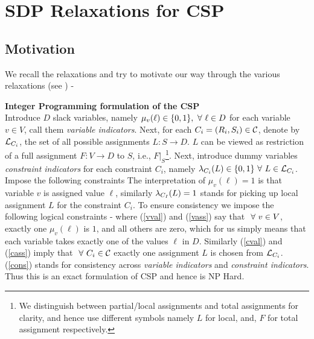 \section{SDP Relaxations for CSP}

\subsection{Motivation}

We recall the relaxations and try to motivate our way through the various relaxations (see \cite{Ryan}) -
\begin{discussion}{\bf Integer Programming formulation of the CSP}\\
Introduce $D$ slack variables, namely $\mu_v(\ell) \in \{ 0, 1 \}, \ \forall \  \ell \in D$ for each variable $v \in V$, call them \textit{variable indicators}. 
Next, for each $C_i=(R_i,S_i)\in \mathcal{C}$, denote by $\mathcal{L}_{C_i}$, the set of all possible assignments $L : S \rightarrow D$. 
$L$ can be viewed as restriction of a full assignment $F: V \rightarrow D$ to $S$, i.e., $F|_S$\footnote{We distinguish between partial/local assignments and total assignments for clarity, and hence use different symbols namely $L$ for local, and, $F$ for total assignment respectively.}. 
Next, introduce dummy variables \textit{constraint indicators} for each constraint $C_i$, namely $\lambda_{C_i}(L) \in \{ 0, 1\} \ \forall \  L \in \mathcal{L}_{C_i}$. 
Impose the following constraints 
The interpretation of $\mu_v(\ell)=1$ is that variable $v$ is assigned value $\ell$, similarly $\lambda_{C_I}(L)=1$ stands for picking up local assignment $L$ for the constraint $C_i$. 
To ensure consistency we impose the following logical constraints -
  where (\ref{vval}) and (\ref{vass}) say that $\ \forall \  v \in V$, exactly one $\mu_v(\ell)$ is $1$, and all others are zero, which for us simply means that each variable takes exactly one of the values $\ell$ in $D$. 
Similarly (\ref{cval}) and (\ref{cass}) imply that $\ \forall \  C_i \in \mathcal{C}$ exactly one assignment $L$ is chosen from $\mathcal{L}_{C_i}$. 
(\ref{cons}) stands for consistency across \textit{variable indicators} and \textit{constraint indicators}.
Thus this is an exact formulation of CSP and hence is NP Hard. 
\end{discussion}

